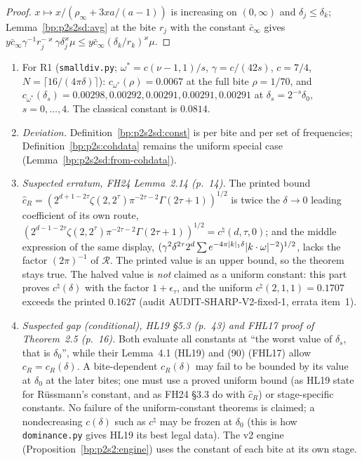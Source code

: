 \begin{proof}
\label{step:p2s2sd:avt}
$x\mapsto x/(\rho_\infty+3xa/(a-1))$ is increasing on $(0,\infty)$ and $\delta_j\le\delta_k$; Lemma~\ref{bp:p2s2sd:avg} at the bite $r_j$ with the constant
$\bar c_\infty$ gives $y\bar c_\infty\gamma^{-1}r_j^{-\varkappa}\gamma\delta_j^\varkappa\mu\le y\bar c_\infty(\delta_k/r_k)^\varkappa\mu$.
\end{proof}

\begin{remark}\label{bp:p2s2sd:errata}
\begin{enumerate}[label=(\roman*)]
\item For R1 (\texttt{smalldiv.py}; $\omega^*=c(\nu-1,1)/s$, $\gamma=c/(42s)$, $c=7/4$, $N=\lceil16/(4\pi\delta)\rceil$):
  $c_{\omega^*}(\rho)=0.0067$ at the full bite $\rho=1/70$, and $c_{\omega^*}(\delta_s)=0.00298,0.00292,0.00291,0.00291,0.00291$ at
  $\delta_s=2^{-s}\delta_0$, $s=0,\dots,4$. The classical constant is $0.0814$.
\item \emph{Deviation.} Definition~\ref{bp:p2s2sd:const} is per bite and per set of frequencies; Definition~\ref{bp:p2s:cohdata} remains the
  uniform special case (Lemma~\ref{bp:p2s2sd:from-cohdata}).
\item \emph{Suspected erratum, FH24 Lemma~2.14 (p.~14).} The printed bound
  $\hat c_R=(2^{d+1-2\tau}\zeta(2,2^\tau)\pi^{-2\tau-2}\Gamma(2\tau+1))^{1/2}$ is twice the $\delta\to0$ leading coefficient of its own route,
  $(2^{d-1-2\tau}\zeta(2,2^\tau)\pi^{-2\tau-2}\Gamma(2\tau+1))^{1/2}=c^\natural(d,\tau,0)$; and the middle expression of the same display,
  $(\gamma^2\delta^{2\tau}2^d\sum e^{-4\pi\lvert k\rvert_1\delta}\lvert k\cdot\omega\rvert^{-2})^{1/2}$, lacks the factor $(2\pi)^{-1}$ of $\mathcal R$. The printed
  value is an upper bound, so the theorem stays true. The halved value is \emph{not} claimed as a uniform constant: this part proves
  $c^\natural(\delta)$ with the factor $1+\epsilon_\tau$, and the uniform $c^\natural(2,1,1)=0.1707$ exceeds the printed $0.1627$ (audit
  AUDIT-SHARP-V2-fixed-1, errata item~1).
\item \emph{Suspected gap (conditional), HL19 \S5.3 (p.~43) and FHL17 proof of Theorem~2.5 (p.~16).} Both evaluate all constants at ``the
  worst value of $\delta_s$, that is $\delta_0$'', while their Lemma~4.1 (HL19) and (90) (FHL17) allow $c_R=c_R(\delta)$. A bite-dependent
  $c_R(\delta)$ may fail to be bounded by its value at $\delta_0$ at the later bites; one must use a proved uniform bound (as HL19 state for
  Rüssmann's constant, and as FH24 \S3.3 do with $\hat c_R$) or stage-specific constants. No failure of the uniform-constant theorems is
  claimed; a nondecreasing $c(\delta)$ such as $c^\natural$ may be frozen at $\delta_0$ (this is how \texttt{dominance.py} gives HL19 its best
  legal data). The v2 engine (Proposition~\ref{bp:p2s2:engine}) uses the constant of each bite at its own stage.
\end{enumerate}
\end{remark}
